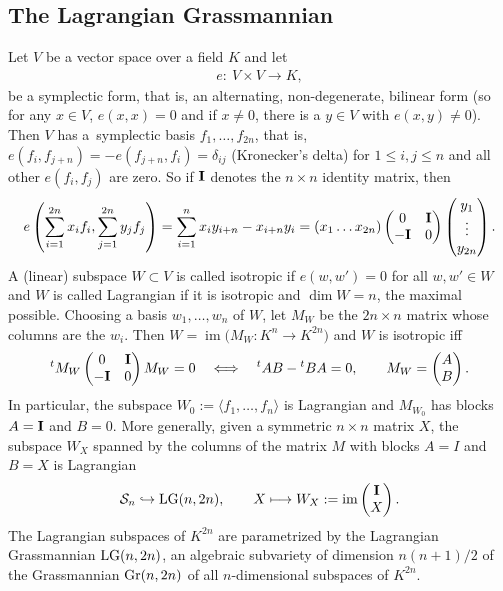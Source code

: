 \documentclass[pdftex]{sigma}
\newcommand{\cS}{{\cal S}}
\numberwithin{equation}{section}
\begin{document}
\subsection{The Lagrangian Grassmannian} \label{Leg}
Let $V$ be a vector space over a field $K$ and let
\begin{gather*}
e\colon \ V\times V \longrightarrow K,
\end{gather*}
be a symplectic form, that is, an alternating, non-degenerate, bilinear form (so for any $x\in V$, $e(x,x)=0$ and if $x\ne 0$, there is a $y\in V$ with $e(x,y)\ne 0$). Then $V$ has a~symplectic basis $f_1,\ldots,f_{2n}$, that is, $e(f_i,f_{j+n})=-e(f_{j+n},f_i)=\delta_{ij}$ (Kronecker's delta) for $1\leq i,j\leq n$ and all other $e(f_i,f_j)$ are zero. So if ${\bf I}$ denotes the $n\times n$ identity matrix, then
\begin{gather*}
e\left(\sum_{i=1}^{2n} x_if_i,\sum_{j=1}^{2n}y_jf_j\right) = \sum_{i=1}^n x_iy_{i+n} - x_{i+n}y_i = (x_1\ldots x_{2n})
\begin{pmatrix}
 0&{\bf I}\\-{\bf I}&0
 \end{pmatrix}\begin{pmatrix}
 y_1\\ \vdots\\y_{2n}
 \end{pmatrix}.
\end{gather*}
A (linear) subspace $W\subset V$ is called isotropic if $e(w,w')=0$ for all $w,w'\in W$ and $W$ is called Lagrangian if it is isotropic and $\dim W=n$, the maximal possible. Choosing a basis $w_1,\ldots, w_n$ of $W$, let $M_W$ be the $2n\times n$ matrix whose columns are the $w_i$. Then $W=\operatorname{im}\big(M_W\colon K^n\rightarrow K^{2n}\big)$ and $W$ is isotropic iff
\begin{gather*}
{}^tM_W\begin{pmatrix}
 0&{\bf I}\\-{\bf I}&0
 \end{pmatrix} M_W = 0\quad\Longleftrightarrow\quad
 {}^tAB - {}^tBA = 0,\qquad M_W = \begin{pmatrix} A\\B\end{pmatrix}.
\end{gather*}
In particular, the subspace $W_0:=\langle f_1,\ldots,f_n\rangle $ is Lagrangian and $M_{W_0}$ has blocks $A={\bf I}$ and $B=0$. More generally, given a symmetric $n\times n$ matrix $X$, the subspace $W_X$ spanned by the columns of the matrix $M$ with blocks $A=I$ and $B=X$ is Lagrangian
\begin{gather*}
\cS_n \hookrightarrow {\rm LG}(n,2n),\qquad X \longmapsto W_X := \operatorname{im}\begin{pmatrix} {\bf I}\\X\end{pmatrix}.
\end{gather*}
The Lagrangian subspaces of $K^{2n}$ are parametrized by the Lagrangian Grassmannian ${\rm LG}(n,2n)$, an algebraic subvariety of dimension $n(n+1)/2$ of the Grassmannian ${\rm Gr}(n,2n)$ of all $n$-di\-men\-sio\-nal subspaces of $K^{2n}$.
\end{document}
